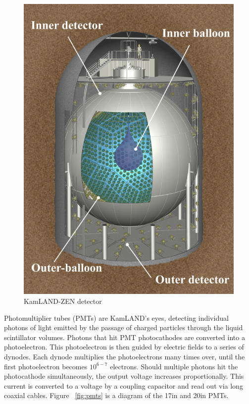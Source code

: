 \begin{figure}[htb]
	\centering
	\includegraphics[scale=0.5]{kamland.png}
	\caption{KamLAND-ZEN detector}
	\label{fig:kamland}
\end{figure}

Photomultiplier tubes (PMTs) are KamLAND's eyes, detecting individual photons of light emitted by the passage of charged particles through the liquid scintillator volumes. Photons that hit PMT photocathodes are converted into a photoelectron. This photoelectron is then guided by electric fields to a series of dynodes. Each dynode multiplies the photoelectrons many times over, until the first photoelectron becomes $10^{6-7}$ electrons. Should multiple photons hit the photocathode simultaneously, the output voltage increases proportionally. This current is converted to a voltage by a coupling capacitor and read out via long coaxial cables. Figure ~\ref{fig:pmts} is a diagram of the 17in and 20in PMTs.

